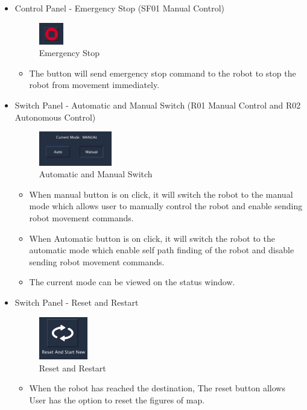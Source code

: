 \documentclass[12pt,a4paper]{article}
\begin{document}
\begin{itemize}
\item Control Panel - Emergency Stop (SF01 Manual Control)
\begin{figure}[!htb]
\centering
\includegraphics[width=0.1\textwidth]{EmergencyStop}
\caption{Emergency Stop} 
\end{figure}
\begin{itemize}
\item The button will send emergency stop command to the robot to stop the robot from movement immediately.
\end{itemize}

\item Switch Panel - Automatic and Manual Switch (R01 Manual Control and R02 Autonomous Control)\\
\begin{figure}[!htb]
\centering
\includegraphics[width=0.3\textwidth]{AutoManualSwitcher}
\caption{ Automatic and Manual Switch} 
\end{figure}
\begin{itemize}
\item When manual button is on click, it will switch the robot to the manual mode which allows user to manually control the robot and enable sending robot movement commands.
\item When Automatic button is on click, it will switch the robot to the automatic mode which enable self path finding of the robot and disable sending robot movement commands.
\item The current mode can be viewed on the status window.
\end{itemize}

\item Switch Panel - Reset and Restart\\
\begin{figure}[!htb]
\centering
\includegraphics[width=0.2\textwidth]{Reset}
\caption{Reset and Restart} 
\end{figure}
\begin{itemize}
\item When the robot has reached the destination, The reset button allows User has the option to reset the figures of map.
\end{itemize}


\end{itemize}
\end{document}
